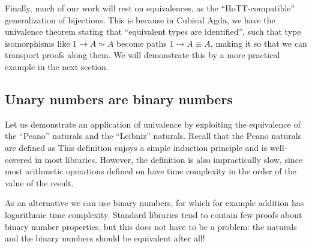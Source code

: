 Finally, %
much of our work will rest on equivalences, as the ``HoTT-compatible'' generalization of bijections. This is because in Cubical Agda, we have the univalence theorem 
stating that ``equivalent types are identified'', such that type isomorphisms like $1 \to A \simeq A$ become paths $1 \to A \equiv A$, making it so that we can transport proofs along them. We will demonstrate this by a more practical example in the next section.


\subsection{Unary numbers are binary numbers}\label{ssec:binary}
Let us demonstrate an application of univalence by exploiting the equivalence of the ``Peano'' naturals and the ``Leibniz'' naturals. Recall that the Peano naturals are defined as 
This definition enjoys a simple induction principle and is well-covered in most libraries. However, the definition is also impractically slow, since most arithmetic operations defined on \bN{} have time complexity in the order of the value of the result.

As an alternative we can use binary numbers, for which for example addition has logarithmic time complexity. Standard libraries tend to contain few proofs about binary number properties, but this does not have to be a problem: the \bN{} naturals and the binary numbers should be equivalent after all!

